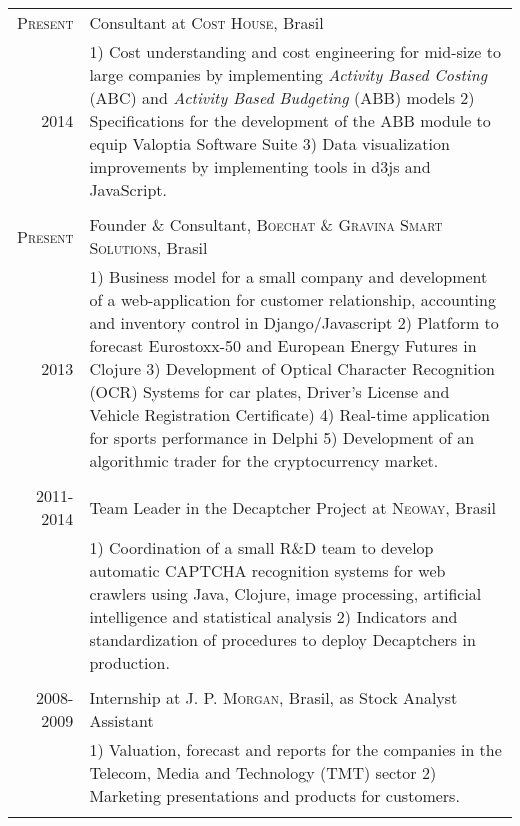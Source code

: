 \documentclass[a4paper,10pt]{article} %
\begin{document}
\begin{tabular}{r|p{11cm}}
\textsc{Present} & Consultant at \textsc{Cost House}, Brasil \\
\textsc{2014} & \footnotesize{1) Cost understanding and cost
  engineering for mid-size to large companies by implementing \textit{Activity Based
  Costing} (ABC) and \textit{Activity Based Budgeting} (ABB) models 2)
  Specifications for the development of the ABB module to equip Valoptia Software
  Suite 3) Data visualization improvements by implementing tools in d3js and JavaScript. }\\
\multicolumn{2}{c}{} \\


\textsc{Present} & Founder \& Consultant, \textsc{Boechat \&
  Gravina Smart Solutions}, Brasil \\
\textsc{2013} & \footnotesize{1) Business model for a small company and
  development of a web-application for
  customer relationship, accounting and inventory control in Django/Javascript
  2) Platform to forecast Eurostoxx-50 and European Energy Futures in
  Clojure 3) Development of Optical Character Recognition (OCR) Systems for
  car plates, Driver's License and Vehicle Registration Certificate) 4) Real-time application for sports performance in Delphi 5) Development of an algorithmic trader for the
  cryptocurrency market. 
  }
\\
\multicolumn{2}{c}{} \\


\textsc{2011-2014} & Team Leader in the Decaptcher Project at
\textsc{Neoway}, Brasil \\
& \footnotesize{1) Coordination of a small R\&D team to develop automatic
  CAPTCHA recognition systems for web crawlers using Java, Clojure,
  image processing, artificial intelligence and statistical analysis
  2) Indicators and standardization of procedures to deploy Decaptchers in production. } \\
\multicolumn{2}{c}{} \\


\textsc{2008-2009} & Internship at \textsc{J. P. Morgan}, Brasil, as Stock
Analyst Assistant \\
& \footnotesize{1) Valuation, forecast and reports for the companies in the Telecom, Media and Technology (TMT)
  sector 2) Marketing presentations and products for customers.}\\
\multicolumn{2}{c}{} \\


\end{tabular}
\end{document}
